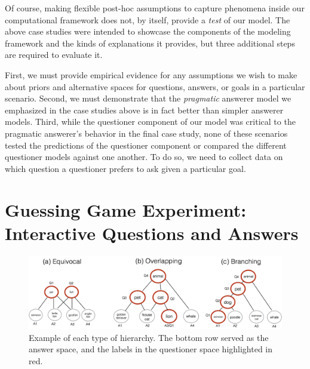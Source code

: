 \documentclass[12pt, floatsintext, jou]{apa6}
\begin{document}

Of course, making flexible post-hoc assumptions to capture phenomena inside our computational framework does not, by itself, provide a \emph{test} of our model. The above case studies were intended to showcase the components of the modeling framework and the kinds of explanations it provides, but three additional steps are required to evaluate it. 

First, we must provide empirical evidence for any assumptions we wish to make about priors and alternative spaces for questions, answers, or goals in a particular scenario. Second, we must demonstrate that the \emph{pragmatic} answerer model we emphasized in the case studies above is in fact better than simpler answerer models. Third, while the questioner component of our model was critical to the pragmatic answerer's behavior in the final case study, none of these scenarios tested the predictions of the questioner component or compared the different questioner models against one another. To do so, we need to collect data on which question a questioner prefers to ask given a particular goal. 

\section{Guessing Game Experiment: \\Interactive Questions and Answers}

\begin{figure}[t!]
\begin{center}
\includegraphics[scale = .3]{hierarchyStructureExamples.png}
\end{center}
\caption{Example of each type of hierarchy. The bottom row served as the answer space, and the labels in the questioner space highlighted in red.}
\label{fig:hierarchyStructures}
\end{figure}
\end{document}
